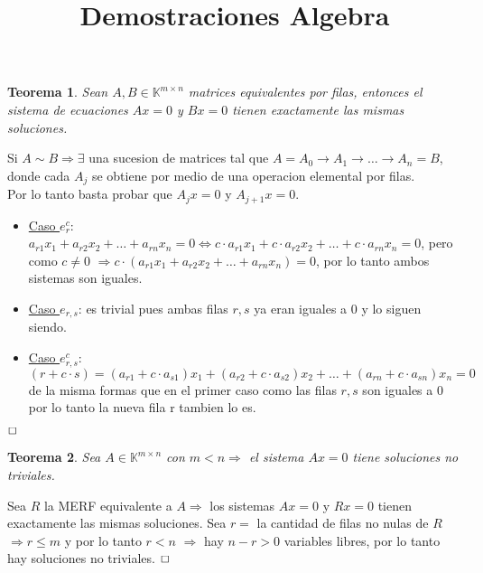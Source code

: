 \documentclass[]{article}
\newtheorem{theorem}{Teorema}
\newenvironment{proof}{\noindent{\bf Prueba:}}{$\hfill \Box$ \vspace{10pt}}
\begin{document}
\title{Demostraciones Algebra}
\maketitle

\newcommand{\iSection}[1]{
  \phantomsection
  \addcontentsline{toc}{section}{#1}
}
\newcommand{\kk}{
    \mathbb{K}
}
\newcommand{\ida}{\Longrightarrow}
\newcommand{\vuelta}{\longleftarrow}

\begin{theorem}
    Sean $A,B \in \mathbb{K}^{m\times n}$  matrices equivalentes por filas, entonces el sistema
    de ecuaciones $Ax=0$ y $Bx=0$ tienen exactamente las mismas soluciones. 
\end{theorem}
\begin{proof}
    Si $A \sim B \Longrightarrow \exists$ una sucesion de matrices tal que
    $A=A_0 \rightarrow A_1 \rightarrow \dots \rightarrow A_n=B$, donde cada $A_j$ se obtiene por
    medio de una operacion elemental por filas.\\
    Por lo tanto basta probar que $A_jx=0$ y $A_{j+1}x=0$.
    \begin{itemize}
        \item \underline{Caso $e_r^c$}: $a_{r1}x_1+a_{r2}x_2+ \dots +a_{rn}x_n = 0 \iff
        c \cdot a_{r1}x_1+c \cdot a_{r2}x_2+ \dots +c \cdot a_{rn}x_n = 0$, pero como $c \neq 0$
        $\Longrightarrow c \cdot (a_{r1}x_1+a_{r2}x_2+ \dots +a_{rn}x_n) = 0$, por lo tanto 
        ambos sistemas son iguales.
        \item \underline{Caso $e_{r,s}$}: es trivial pues ambas filas $r,s$ ya eran iguales a 0
        y lo siguen siendo.
        \item \underline{Caso $e_{r,s}^c$}: $(r + c \cdot s) = (a_{r1}+c\cdot a_{s1})x_1+
        (a_{r2}+c\cdot a_{s2})x_2+ \dots +(a_{rn}+c\cdot a_{sn})x_n = 0$ de la misma formas que en
        el primer caso como las filas $r,s$ son iguales a 0 por lo tanto la nueva fila r tambien lo es.
    \end{itemize}
\end{proof}

\begin{theorem}
    Sea $A \in \mathbb{K}^{m\times n}$ con $m<n \Longrightarrow$ el sistema $Ax=0$
    tiene soluciones no triviales.
\end{theorem}
\begin{proof}
    Sea $R$ la MERF equivalente a $A \Longrightarrow$ los sistemas $Ax=0$ y $Rx=0$ tienen
    exactamente las mismas soluciones. Sea $r=$ la cantidad de filas no nulas de $R$
    $\Longrightarrow r \leq m$ y por lo tanto $r < n$ $\Longrightarrow$ hay $n-r>0$
    variables libres, por lo tanto hay soluciones no triviales.
\end{proof}
\end{document}
